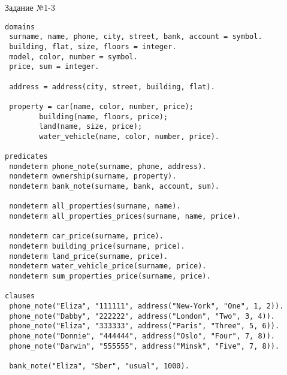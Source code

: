 \begin{code}
\caption{Задание №1-3}
\label{code:bf2}
\begin{verbatim}
domains
 surname, name, phone, city, street, bank, account = symbol.
 building, flat, size, floors = integer.
 model, color, number = symbol.
 price, sum = integer.
 
 address = address(city, street, building, flat).
 
 property = car(name, color, number, price);
 	    building(name, floors, price);
 	    land(name, size, price);
 	    water_vehicle(name, color, number, price).

predicates
 nondeterm phone_note(surname, phone, address).
 nondeterm ownership(surname, property).
 nondeterm bank_note(surname, bank, account, sum).
 
 nondeterm all_properties(surname, name).
 nondeterm all_properties_prices(surname, name, price).
 
 nondeterm car_price(surname, price).
 nondeterm building_price(surname, price).
 nondeterm land_price(surname, price).
 nondeterm water_vehicle_price(surname, price).
 nondeterm sum_properties_price(surname, price).

clauses
 phone_note("Eliza", "111111", address("New-York", "One", 1, 2)).
 phone_note("Dabby", "222222", address("London", "Two", 3, 4)).
 phone_note("Eliza", "333333", address("Paris", "Three", 5, 6)).
 phone_note("Donnie", "444444", address("Oslo", "Four", 7, 8)).
 phone_note("Darwin", "555555", address("Minsk", "Five", 7, 8)).
 
 bank_note("Eliza", "Sber", "usual", 1000).
\end{verbatim}
\end{code}

